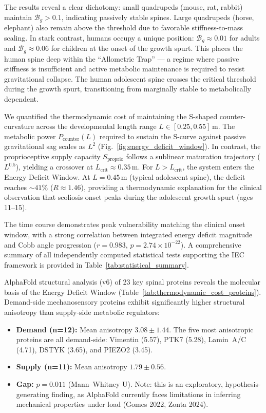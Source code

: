 \documentclass[11pt]{article}
\begin{document}
The results reveal a clear dichotomy: small quadrupeds (mouse, rat, rabbit) maintain $\mathcal{B}_g > 0.1$, indicating passively stable spines. Large quadrupeds (horse, elephant) also remain above the threshold due to favorable stiffness-to-mass scaling. In stark contrast, humans occupy a unique position: $\mathcal{B}_g \approx 0.01$ for adults and $\mathcal{B}_g \approx 0.06$ for children at the onset of the growth spurt. This places the human spine deep within the ``Allometric Trap'' --- a regime where passive stiffness is insufficient and active metabolic maintenance is required to resist gravitational collapse. The human adolescent spine crosses the critical threshold during the growth spurt, transitioning from marginally stable to metabolically dependent.



We quantified the thermodynamic cost of maintaining the S-shaped counter-curvature across the developmental length range $L \in [0.25, 0.55]$\,m. The metabolic power $P_{\mathrm{counter}}(L)$ required to sustain the S-curve against passive gravitational sag scales as $L^2$ (Fig.~\ref{fig:energy_deficit_window}). In contrast, the proprioceptive supply capacity $S_{\mathrm{proprio}}$ follows a sublinear maturation trajectory ($L^{0.5}$), yielding a crossover at $L_{\mathrm{crit}} \approx 0.35$\,m. For $L > L_{\mathrm{crit}}$, the system enters the Energy Deficit Window. At $L = 0.45$\,m (typical adolescent spine), the deficit reaches ${\sim}41\%$ ($R \approx 1.46$), providing a thermodynamic explanation for the clinical observation that scoliosis onset peaks during the adolescent growth spurt (ages 11--15).

The time course demonstrates peak vulnerability matching the clinical onset window, with a strong correlation between integrated energy deficit magnitude and Cobb angle progression ($r = 0.983$, $p = 2.74 \times 10^{-22}$). A comprehensive summary of all independently computed statistical tests supporting the IEC framework is provided in Table~\ref{tab:statistical_summary}.



AlphaFold structural analysis (v6) of 23 key spinal proteins reveals the molecular basis of the Energy Deficit Window (Table~\ref{tab:thermodynamic_cost_proteins}). Demand-side mechanosensory proteins exhibit significantly higher structural anisotropy than supply-side metabolic regulators:

\begin{itemize}
    \item \textbf{Demand (n=12):} Mean anisotropy $3.08 \pm 1.44$. The five most anisotropic proteins are all demand-side: Vimentin (5.57), PTK7 (5.28), Lamin~A/C (4.71), DSTYK (3.65), and PIEZO2 (3.45).
    \item \textbf{Supply (n=11):} Mean anisotropy $1.79 \pm 0.56$.
    \item \textbf{Gap:} $p = 0.011$ (Mann--Whitney U). Note: this is an exploratory, hypothesis-generating finding, as AlphaFold currently faces limitations in inferring mechanical properties under load (Gomes 2022, Zonta 2024).
\end{itemize}
\end{document}
